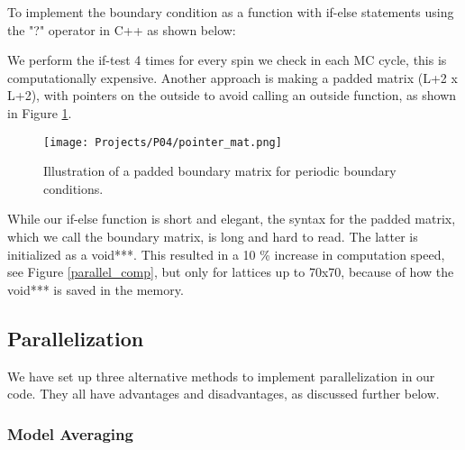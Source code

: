 \documentclass[a4paper]{article}
\begin{document}
To implement the boundary condition as a function with if-else statements using the "?" operator in C++ as shown below:
% 

 \lstset{style=mystyle}


We perform the if-test 4 times for every spin we check in each MC cycle, this is computationally expensive. Another approach is making a padded matrix (L+2 x L+2), with pointers on the outside to avoid calling an outside function, as shown in Figure \ref{pointer_mat}. 

\begin{figure}[H]
  \centering
  \texttt{[image: Projects/P04/pointer\_mat.png]}
  \caption{Illustration of a padded boundary matrix for periodic boundary conditions.}
  \label{pointer_mat}
\end{figure}



While our if-else function is short and elegant, the syntax for the padded matrix, which we call the boundary matrix, is long and hard to read. The latter is initialized as a void***. This resulted in a 10 \% increase in computation speed, see Figure \ref{parallel_comp}, but only for lattices up to 70x70, because of how the void*** is saved in the memory.


\subsection{Parallelization}

We have set up three alternative methods to implement parallelization in our code. They all have advantages and disadvantages, as discussed further below.

\subsubsection*{Model Averaging}
\end{document}

